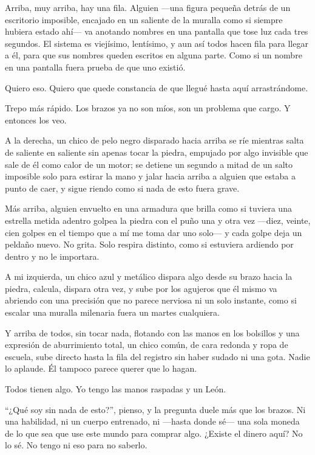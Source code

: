 Arriba, muy arriba, hay una fila. Alguien —una figura pequeña detrás de un escritorio imposible, encajado en un saliente de la muralla como si siempre hubiera estado ahí— va anotando nombres en una pantalla que tose luz cada tres segundos. El sistema es viejísimo, lentísimo, y aun así todos hacen fila para llegar a él, para que sus nombres queden escritos en alguna parte. Como si un nombre en una pantalla fuera prueba de que uno existió.

Quiero eso. Quiero que quede constancia de que llegué hasta aquí arrastrándome.

Trepo más rápido. Los brazos ya no son míos, son un problema que cargo. Y entonces los veo.

A la derecha, un chico de pelo negro disparado hacia arriba se ríe mientras salta de saliente en saliente sin apenas tocar la piedra, empujado por algo invisible que sale de él como calor de un motor; se detiene un segundo a mitad de un salto imposible solo para estirar la mano y jalar hacia arriba a alguien que estaba a punto de caer, y sigue riendo como si nada de esto fuera grave.

Más arriba, alguien envuelto en una armadura que brilla como si tuviera una estrella metida adentro golpea la piedra con el puño una y otra vez —diez, veinte, cien golpes en el tiempo que a mí me toma dar uno solo— y cada golpe deja un peldaño nuevo. No grita. Solo respira distinto, como si estuviera ardiendo por dentro y no le importara.

A mi izquierda, un chico azul y metálico dispara algo desde su brazo hacia la piedra, calcula, dispara otra vez, y sube por los agujeros que él mismo va abriendo con una precisión que no parece nerviosa ni un solo instante, como si escalar una muralla milenaria fuera un martes cualquiera.

Y arriba de todos, sin tocar nada, flotando con las manos en los bolsillos y una expresión de aburrimiento total, un chico común, de cara redonda y ropa de escuela, sube directo hasta la fila del registro sin haber sudado ni una gota. Nadie lo aplaude. Él tampoco parece querer que lo hagan.

Todos tienen algo. Yo tengo las manos raspadas y un León.

``¿Qué soy sin nada de esto?'', pienso, y la pregunta duele más que los brazos. Ni una habilidad, ni un cuerpo entrenado, ni —hasta donde sé— una sola moneda de lo que sea que use este mundo para comprar algo. ¿Existe el dinero aquí? No lo sé. No tengo ni eso para no saberlo.

